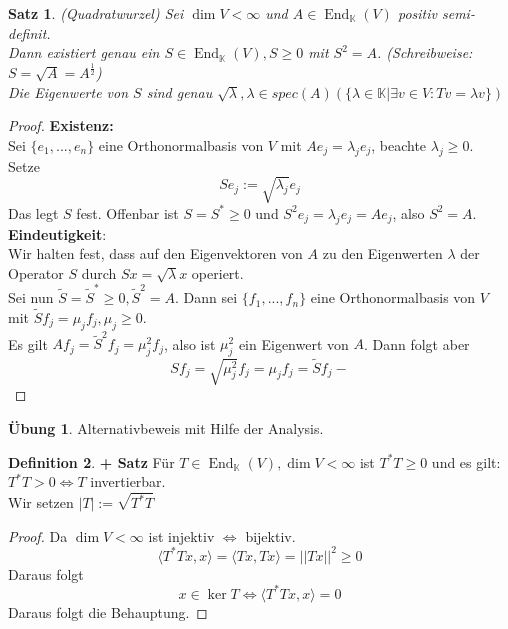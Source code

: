\documentclass[12pt,a4paper]{article}
\newtheorem{theorem}{Satz}
\theoremstyle{definition}
\newtheorem{definition}[theorem]{Definition}
\newtheorem*{exercise}{Übung}
\theoremstyle{remark}
\DeclareMathOperator{\End}{End}
\begin{document}
	\begin{theorem}{(Quadratwurzel)}
		Sei $\dim V <\infty$ und $A \in \End_{\mathbb{K}}(V)$ positiv semi-definit. \\
		Dann existiert genau ein $S \in \End_{\mathbb{K}}(V), S \geq 0$ mit $S^2=A$.
		(Schreibweise: $S = \sqrt{A}=A^{\frac{1}{2}}$) \\
		Die Eigenwerte von $S$ sind genau $\sqrt{\lambda}, \lambda \in spec(A)(\{\lambda \in \mathbb{K}| \exists v \in V: Tv = \lambda v \})$
	\end{theorem}
	\begin{proof}
		\textbf{Existenz:} \\	
		Sei $\{ e_1,...,e_n \}$ eine Orthonormalbasis von $V$ mit $Ae_j=\lambda_j e_j$, beachte $\lambda_j \geq 0$. \\
		Setze
		\begin{equation}
			Se_j := \sqrt{\lambda_j}e_j
		\end{equation}
		Das legt $S$ fest. Offenbar ist $S = S^* \geq 0$ und $S^2e_j = \lambda_je_j=Ae_j$, also $S^2 = A$. \\
		\textbf{Eindeutigkeit}: \\		
		Wir halten fest, dass auf den Eigenvektoren von $A$ zu den Eigenwerten $\lambda$ der Operator $S$ durch $Sx = \sqrt{\lambda}x$ operiert. \\
		Sei nun $\tilde{S} = \tilde{S}^* \geq 0, \tilde{S}^2=A$. Dann sei $\{ f_1,...,f_n \}$ eine Orthonormalbasis von $V$ mit $\tilde{S}f_j= \mu_jf_j, \mu_j \geq 0$. \\
		Es gilt $Af_j = \tilde{S}^2f_j = \mu_j^2f_j$, also ist $\mu_j^2$ ein Eigenwert von $A$.
		Dann folgt aber
		\begin{equation}
			Sf_j = \sqrt{\mu_j^2}f_j= \mu_jf_j = \tilde{S}f_j-
		\end{equation}
	\end{proof}
	\begin{exercise}
		Alternativbeweis mit Hilfe der Analysis.
	\end{exercise}
	\begin{definition}{\textbf{+ Satz}}
		Für $T \in \End_{\mathbb{K}}(V),\dim V < \infty$ ist $T^*T \geq 0$ und es gilt: \\
		$T^*T >0 \Leftrightarrow T$ invertierbar. \\
		Wir setzen $|T|:= \sqrt{T^*T}$
	\end{definition}
	\begin{proof}
		Da $\dim V < \infty$ ist injektiv $\Leftrightarrow$ bijektiv. \\
		\begin{equation}
			\langle T^*Tx,x \rangle = \langle Tx,Tx \rangle = ||Tx||^2 \geq 0
		\end{equation}
		Daraus folgt
		\begin{equation}
			x \in \ker T \Leftrightarrow \langle T^*Tx,x \rangle = 0
		\end{equation}
		Daraus folgt die Behauptung.
	\end{proof}
\end{document}
